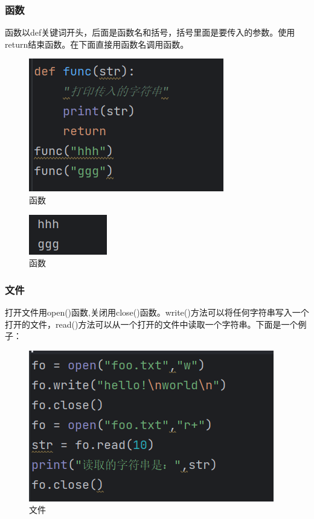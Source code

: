 \documentclass{ctexart}
\begin{document}
	\subsubsection{函数}
	函数以def关键词开头，后面是函数名和括号，括号里面是要传入的参数。使用return结束函数。在下面直接用函数名调用函数。
	
	\begin{figure}[H]
		\centering
		\includegraphics[scale=0.5]{3.65}
		\caption{函数}
	\end{figure}
	
	\begin{figure}[H]
		\centering
		\includegraphics[scale=0.5]{3.66}
		\caption{函数}
	\end{figure}
	
	\subsubsection{文件}
	
	打开文件用open()函数,关闭用close()函数。write()方法可以将任何字符串写入一个打开的文件，read()方法可以从一个打开的文件中读取一个字符串。下面是一个例子：
	
	\begin{figure}[H]
		\centering
		\includegraphics[scale=0.5]{3.67}
		\caption{文件}
	\end{figure}
	
\end{document}
